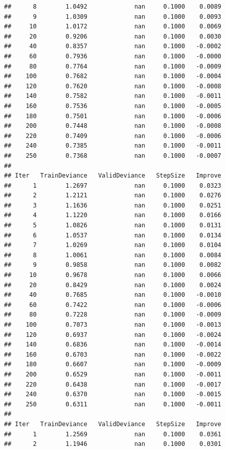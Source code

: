 \documentclass[
]{book}
\begin{document}
\begin{verbatim}
##      8        1.0492             nan     0.1000    0.0089
##      9        1.0309             nan     0.1000    0.0093
##     10        1.0172             nan     0.1000    0.0069
##     20        0.9206             nan     0.1000    0.0030
##     40        0.8357             nan     0.1000   -0.0002
##     60        0.7936             nan     0.1000   -0.0000
##     80        0.7764             nan     0.1000   -0.0009
##    100        0.7682             nan     0.1000   -0.0004
##    120        0.7620             nan     0.1000   -0.0008
##    140        0.7582             nan     0.1000   -0.0011
##    160        0.7536             nan     0.1000   -0.0005
##    180        0.7501             nan     0.1000   -0.0006
##    200        0.7448             nan     0.1000   -0.0008
##    220        0.7409             nan     0.1000   -0.0006
##    240        0.7385             nan     0.1000   -0.0011
##    250        0.7368             nan     0.1000   -0.0007
## 
## Iter   TrainDeviance   ValidDeviance   StepSize   Improve
##      1        1.2697             nan     0.1000    0.0323
##      2        1.2121             nan     0.1000    0.0276
##      3        1.1636             nan     0.1000    0.0251
##      4        1.1220             nan     0.1000    0.0166
##      5        1.0826             nan     0.1000    0.0131
##      6        1.0537             nan     0.1000    0.0134
##      7        1.0269             nan     0.1000    0.0104
##      8        1.0061             nan     0.1000    0.0084
##      9        0.9858             nan     0.1000    0.0082
##     10        0.9678             nan     0.1000    0.0066
##     20        0.8429             nan     0.1000    0.0024
##     40        0.7685             nan     0.1000   -0.0010
##     60        0.7422             nan     0.1000   -0.0006
##     80        0.7228             nan     0.1000   -0.0009
##    100        0.7073             nan     0.1000   -0.0013
##    120        0.6937             nan     0.1000   -0.0024
##    140        0.6836             nan     0.1000   -0.0014
##    160        0.6703             nan     0.1000   -0.0022
##    180        0.6607             nan     0.1000   -0.0009
##    200        0.6529             nan     0.1000   -0.0011
##    220        0.6438             nan     0.1000   -0.0017
##    240        0.6370             nan     0.1000   -0.0015
##    250        0.6311             nan     0.1000   -0.0011
## 
## Iter   TrainDeviance   ValidDeviance   StepSize   Improve
##      1        1.2569             nan     0.1000    0.0361
##      2        1.1946             nan     0.1000    0.0301

\end{verbatim}
\end{document}
